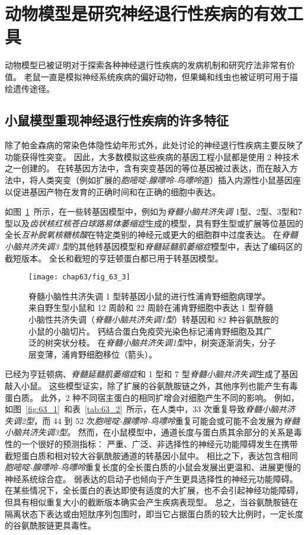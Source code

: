 \section{动物模型是研究神经退行性疾病的有效工具}

动物模型已被证明对于探索各种神经退行性疾病的发病机制和研究疗法非常有价值。
老鼠一直是模拟神经系统疾病的偏好动物，但果蝇和线虫也被证明可用于描绘遗传途径。



\subsection{小鼠模型重现神经退行性疾病的许多特征}

除了帕金森病的常染色体隐性幼年形式外，此处讨论的神经退行性疾病主要反映了功能获得性突变。
因此，大多数模拟这些疾病的基因工程小鼠都是使用 2 种技术之一创建的。
在转基因方法中，含有突变基因的等位基因被过表达，而在敲入方法中，将人类突变（例如扩展的\textit{胞嘧啶-腺嘌呤-鸟嘌呤}道）插入内源性小鼠基因座以促进基因产物在发育的正确时间和在正确的细胞中表达。


如图~\ref{fig:63_3}~所示，在一些转基因模型中，例如为\textit{脊髓小脑共济失调} 1型、2型、3型和7型以及\textit{齿状核红核苍白球路易体萎缩症}生成的模型，具有野生型或扩展等位基因的全长\textit{互补脱氧核糖核酸}在特定类别的神经元或更大的细胞群中过度表达。
在\textit{脊髓小脑共济失调3 型}的其他转基因模型和\textit{脊髓延髓肌萎缩症}模型中，表达了编码区的截短版本。
全长和截短的亨廷顿蛋白都已用于转基因模型。


\begin{figure}[htbp]
	\centering
	\texttt{[image: chap63/fig\_63\_3]}
	\caption{脊髓小脑性共济失调 1 型转基因小鼠的进行性浦肯野细胞病理学。
		来自野生型小鼠和 12 周龄和 22 周龄在浦肯野细胞中表达 1 型脊髓小脑性共济失调（\textit{脊髓小脑共济失调1型}）转基因和 82 种谷氨酰胺的小鼠的小脑切片。
		钙结合蛋白免疫荧光染色标记浦肯野细胞及其广泛的树突状分枝。
		在\textit{脊髓小脑共济失调1型}中，树突逐渐消失，分子层变薄，浦肯野细胞移位（箭头）。}
	\label{fig:63_3}
\end{figure}


已经为亨廷顿病、\textit{脊髓延髓肌萎缩症}和 1 型和 7 型\textit{脊髓小脑共济失调}生成了基因敲入小鼠。
这些模型证实，除了扩展的谷氨酰胺链之外，其他序列也能产生有毒蛋白质。
此外，2 种不同宿主蛋白的相同扩增会对细胞产生不同的影响。
例如，如图~\ref{fig:63_1}~和表~\ref{tab:63_2}~所示，在人类中，33 次重复导致\textit{脊髓小脑共济失调2型}，而 44 到 52 次\textit{胞嘧啶-腺嘌呤-鸟嘌呤}重复可能会或可能不会发展为\textit{脊髓小脑共济失调3型}。
然而，在小鼠模型中，通道长度与蛋白质其余部分的关系是毒性的一个很好的预测指标：
严重、广泛、非选择性的神经元功能障碍发生在携带截短蛋白质和相对较大谷氨酰胺通道的转基因小鼠中。
相比之下，表达包含相同\textit{胞嘧啶-腺嘌呤-鸟嘌呤}重复长度的全长蛋白质的小鼠会发展出更温和、进展更慢的神经系统综合症。
弱表达的启动子也倾向于产生更具选择性的神经元功能障碍。
在某些情况下，全长蛋白的表达即使有适度的大扩展，也不会引起神经功能障碍，但具有相似重复大小的截断版本确实会产生疾病表现型。
总之，当谷氨酰胺链在隔离状态下表达或由短肽序列包围时，即当它占据蛋白质的较大比例时，一定长度的谷氨酰胺链更具毒性。


